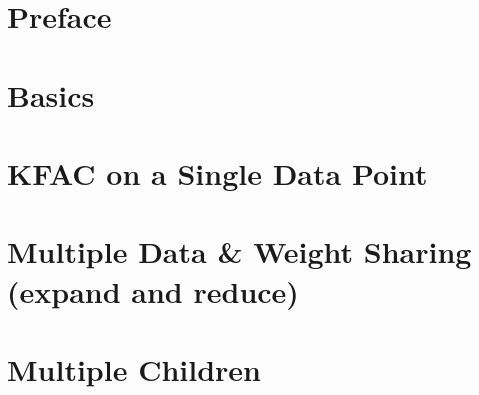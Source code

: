 \documentclass{article}
\begin{document}
\onecolumn


\clearpage

\tableofcontents
\clearpage

\section{Preface}

\clearpage

\section{Basics}


\section{KFAC on a Single Data Point}

\section{Multiple Data \& Weight Sharing (expand and reduce)}

\section{Multiple Children}

\clearpage


\appendix
\end{document}
